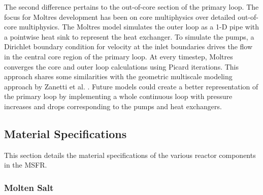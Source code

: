 The second difference pertains to the out-of-core section of the primary loop.
The focus for Moltres development has been on core multiphysics over detailed
out-of-core multiphysics. The Moltres model simulates the outer loop as a 1-D
pipe with a pointwise heat sink to represent the heat exchanger. To simulate
the pumps, a Dirichlet boundary condition for velocity at the inlet boundaries
drives the flow in the central core region of the primary loop. At every
timestep, Moltres converges the core and outer loop calculations using Picard
iterations. This approach shares some similarities with the
geometric multiscale modeling approach by Zanetti et al.
\cite{zanetti_geometric_2015}. Future models could create a better
representation of the primary loop by implementing a whole continuous loop
with pressure increases and drops corresponding to the pumps and heat
exchangers.

\subsection{Material Specifications}

This section details the material specifications of the various reactor
components in the \gls{MSFR}.

\subsubsection{Molten Salt}

